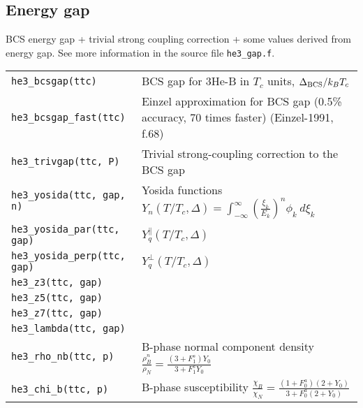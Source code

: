 \documentclass[a4paper]{article}
\begin{document}
{\small}

\eject
\subsection*{Energy gap}

BCS energy gap + trivial strong coupling correction + some values
derived from energy gap. See more information in the
source file {\tt he3\_gap.f}.

\medskip
\noindent\begin{tabular}{lp{11cm}}
\tt he3\_bcsgap(ttc)       & BCS gap for 3He-B in $T_c$ units, $\Delta_{\rm BCS}/ k_B T_c$\\
\tt he3\_bcsgap\_fast(ttc) & Einzel approximation for BCS gap (0.5\% accuracy, 70 times faster)\newline
                             {\small(Einzel-1991, f.68)}\\
\tt he3\_trivgap(ttc, P)   & Trivial strong-coupling correction to the BCS gap\\
\tt he3\_yosida(ttc, gap, n) & Yosida functions $\displaystyle Y_n(T/T_c,\Delta) =
                               \int_{-\infty}^{\infty} \left(\frac{\xi_k}{E_k}\right)^n
                               \phi_k\ d\xi_k$\\
\tt he3\_yosida\_par(ttc, gap)  & $Y_q^\parallel(T/T_c,\Delta)$\\
\tt he3\_yosida\_perp(ttc, gap) & $Y_q^\perp(T/T_c,\Delta)$\\

\tt he3\_z3(ttc, gap) &\\
\tt he3\_z5(ttc, gap) &\\
\tt he3\_z7(ttc, gap) &\\
\tt he3\_lambda(ttc, gap) &\\

\tt he3\_rho\_nb(ttc, p)     &B-phase normal component density\newline
                             $\displaystyle \frac{\rho_B^n}{\rho_{N}} =
                               \frac{(3 + F_1^s) Y_0}{3 + F_1^s Y_0}$\\
\tt he3\_chi\_b(ttc, p)      &B-phase susceptibility\newline
                             $\displaystyle \frac{\chi_B}{\chi_N} =
                               \frac{(1+F_0^a)(2 + Y_0)}
                                     {3+F_0^a(2 + Y_0)}$\\
\end{tabular}
\medskip
\end{document}
